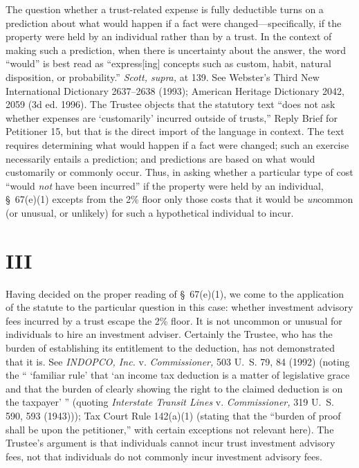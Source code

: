 {  The question whether a trust-related expense is fully deductible turns on a prediction about what would happen if a fact were changed---specifically, if the property were held by an individual rather than by a trust. In the context of making such a prediction, when there is uncertainty about the answer, the word ``would'' is best read as ``express[ing] concepts such as custom, habit, natural disposition, or probability.'' \emph{Scott, supra,} at 139. See Webster's Third New International Dictionary 2637--2638 (1993); American Heritage Dictionary 2042, 2059 (3d ed. 1996). The Trustee objects that the statutory text ``does not ask whether expenses are ‘customarily' incurred outside of trusts,'' Reply Brief for Petitioner 15, but that is the direct import of the language in context. The text requires determining what would happen if a fact were changed; such an exercise necessarily entails a prediction; and predictions are based on what would customarily or commonly occur. Thus, in asking whether a particular type of cost ``would \emph{not} have been incurred'' if the property were held by an individual, \S~67(e)(1) excepts from the 2\% floor only those costs that it would be \emph{un}common (or unusual, or unlikely) for such a hypothetical individual to incur. 

\section{III}

  Having decided on the proper reading of \S~67(e)(1), we come to the application of the statute to the particular question in this case: whether investment advisory fees incurred by a trust escape the 2\% floor. 
  It is not uncommon or unusual for individuals to hire an investment
adviser. Certainly the Trustee, who has the burden of establishing its
entitlement to the deduction, has not demonstrated that it is. See
\emph{INDOPCO, Inc.} v. \emph{Commissioner,} 503 U.~S. 79, 84 (1992) (noting
the `` ‘familiar rule' that ‘an income tax deduction is a matter
of legislative grace and that the burden of clearly showing the right to
the claimed deduction is on the taxpayer' '' (quoting \emph{Interstate
Transit Lines} v. \emph{Commissioner,} 319 U.~S. 590, 593 (1943)));
\newpage  Tax Court Rule 142(a)(1) (stating that the ``burden of proof
shall be upon the petitioner,'' with certain exceptions not relevant
here). The Trustee's argument is that individuals cannot incur trust
investment advisory fees, not that individuals do not commonly incur
investment advisory fees.

}
